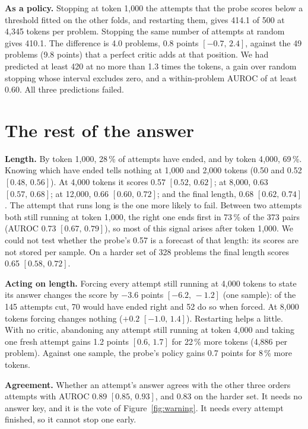 \documentclass[10pt]{article}
\newcommand{\ci}[2]{$[#1,\,#2]$}
\begin{document}
\textbf{As a policy.} Stopping at token 1{,}000 the attempts that the probe scores below a threshold fitted on the
other folds, and restarting them, gives 414.1 of 500 at 4{,}345 tokens per problem. Stopping the same number of
attempts at random gives 410.1. The difference is 4.0 problems, 0.8 points \ci{-0.7}{2.4}, against the 49
problems (9.8 points) that a perfect critic adds at that position. We had predicted at least 420 at no more than
1.3 times the tokens, a gain over random stopping whose interval excludes zero, and a within-problem AUROC of at
least 0.60. All three predictions failed.

\section{The rest of the answer}

\textbf{Length.} By token 1{,}000, 28\,\% of attempts have ended, and by token 4{,}000, 69\,\%. Knowing which
have ended tells nothing at 1{,}000 and 2{,}000 tokens (0.50 and 0.52 \ci{0.48}{0.56}). At 4{,}000 tokens it
scores 0.57 \ci{0.52}{0.62}; at 8{,}000, 0.63 \ci{0.57}{0.68}; at 12{,}000, 0.66 \ci{0.60}{0.72}; and the final
length, 0.68 \ci{0.62}{0.74}. The attempt that runs long is the one more likely to fail. Between two attempts
both still running at token 1{,}000, the right one ends first in 73\,\% of the 373 pairs (AUROC 0.73
\ci{0.67}{0.79}), so most of this signal arises after token 1{,}000. We could not
test whether the probe's 0.57 is a forecast of that length: its scores are not stored per sample. On a harder
set of 328 problems the final length scores 0.65 \ci{0.58}{0.72}.

\textbf{Acting on length.} Forcing every attempt still running at 4{,}000 tokens to state its answer changes the score by $-3.6$
points \ci{-6.2}{-1.2} (one sample): of the 145 attempts cut, 70 would have ended right and 52 do so when forced.
At 8{,}000 tokens forcing changes nothing ($+0.2$ \ci{-1.0}{1.4}). Restarting helps a little. With no critic,
abandoning any attempt still running at token 4{,}000 and taking one fresh attempt gains 1.2 points
\ci{0.6}{1.7} for 22\,\% more tokens (4{,}886 per problem). Against one sample, the probe's policy gains 0.7
points for 8\,\% more tokens.

\textbf{Agreement.} Whether an attempt's answer agrees with the other three orders attempts with AUROC 0.89
\ci{0.85}{0.93}, and 0.83 on the harder set. It needs no answer key, and it is the vote of
Figure~\ref{fig:warning}. It needs every attempt finished, so it cannot stop one early.
\end{document}
